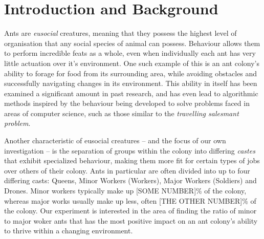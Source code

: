 \section{Introduction and Background}
		
    Ants are \textit{eusocial} creatures, meaning that they possess the highest level of organisation that any social species of animal can possess\cite{wilson_insect_1971, hadley_what_nodate}. Behaviour allows them to perform
    incredible feats as a whole, even when individually each ant has very little actuation over it's environment. One such example of this is an ant colony's ability to forage for food from its surrounding area, while avoiding
    obstacles and successfully navigating changes in its environment. This ability in itself has been examined a significant amount in past research\cite{vittori_modeling_2004, a_panait_ant_2004}, and has even lead to algorithmic
    methods inspired by the behaviour being developed to solve problems faced in areas of computer science, such as those similar to the \textit{travelling salesmant problem}\cite{dorigo_ant_2006, zhang_improved_2007}.

    Another characteristic of eusocial creatures -- and the focus of our own investigation -- is the separation of groups within the colony into differing \textit{castes} that exhibit specialized behaviour, making them more fit
    for certain types of jobs over others of their colony\cite{hadley_what_nodate}. Ants in particular are often divided into up to four differing casts: Queens, Minor Workers (Workers), Major Workers (Soldiers) and Drones\cite{noauthor_ant_nodate,noauthor_castes_nodate}.
    Minor workers typically make up [SOME NUMBER]\% of the colony, %
    whereas major works usually make up less, often [THE OTHER NUMBER]\% of the colony. %
    Our experiment is interested in the area of finding the ratio of minor to major woker ants that has the most positive impact on an ant colony's ability to thrive within a changing environment.


